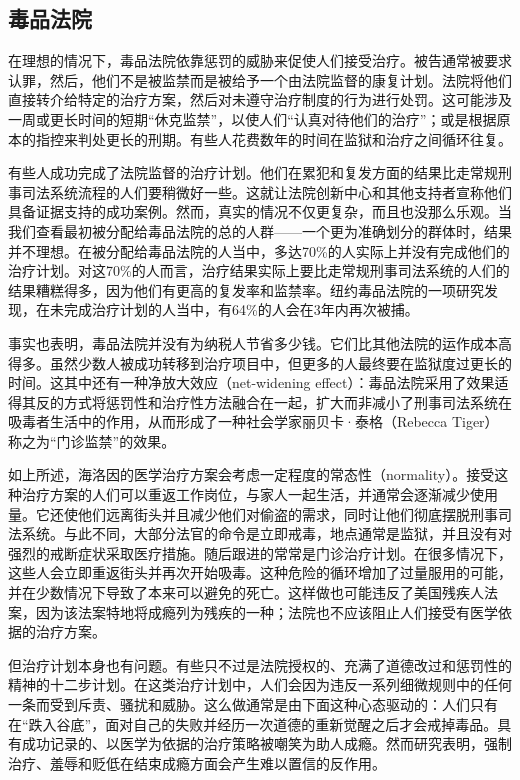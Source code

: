 \documentclass[fontset=fandol, a4paper, 12pt, openright]{ctexbook}
\begin{document}
\subsection{毒品法院}
在理想的情况下，毒品法院依靠惩罚的威胁来促使人们接受治疗。被告通常被要求认罪，然后，他们不是被监禁而是被给予一个由法院监督的康复计划。法院将他们直接转介给特定的治疗方案，然后对未遵守治疗制度的行为进行处罚。这可能涉及一周或更长时间的短期“休克监禁”，以使人们“认真对待他们的治疗”；或是根据原本的指控来判处更长的刑期。有些人花费数年的时间在监狱和治疗之间循环往复。

有些人成功完成了法院监督的治疗计划。他们在累犯和复发方面的结果比走常规刑事司法系统流程的人们要稍微好一些。这就让法院创新中心和其他支持者宣称他们具备证据支持的成功案例。然而，真实的情况不仅更复杂，而且也没那么乐观。当我们查看最初被分配给毒品法院的总的人群——一个更为准确划分的群体时，结果并不理想。在被分配给毒品法院的人当中，多达70\%的人实际上并没有完成他们的治疗计划。对这70\%的人而言，治疗结果实际上要比走常规刑事司法系统的人们的结果糟糕得多，因为他们有更高的复发率和监禁率。纽约毒品法院的一项研究发现，在未完成治疗计划的人当中，有64\%的人会在3年内再次被捕。

事实也表明，毒品法院并没有为纳税人节省多少钱。它们比其他法院的运作成本高得多。虽然少数人被成功转移到治疗项目中，但更多的人最终要在监狱度过更长的时间。这其中还有一种净放大效应（net-widening effect）：毒品法院采用了效果适得其反的方式将惩罚性和治疗性方法融合在一起，扩大而非减小了刑事司法系统在吸毒者生活中的作用，从而形成了一种社会学家丽贝卡·泰格（Rebecca Tiger）称之为“门诊监禁”的效果。

如上所述，海洛因的医学治疗方案会考虑一定程度的常态性（normality）。接受这种治疗方案的人们可以重返工作岗位，与家人一起生活，并通常会逐渐减少使用量。它还使他们远离街头并且减少他们对偷盗的需求，同时让他们彻底摆脱刑事司法系统。与此不同，大部分法官的命令是立即戒毒，地点通常是监狱，并且没有对强烈的戒断症状采取医疗措施。随后跟进的常常是门诊治疗计划。在很多情况下，这些人会立即重返街头并再次开始吸毒。这种危险的循环增加了过量服用的可能，并在少数情况下导致了本来可以避免的死亡。这样做也可能违反了美国残疾人法案，因为该法案特地将成瘾列为残疾的一种；法院也不应该阻止人们接受有医学依据的治疗方案。

但治疗计划本身也有问题。有些只不过是法院授权的、充满了道德改过和惩罚性的精神的十二步计划。在这类治疗计划中，人们会因为违反一系列细微规则中的任何一条而受到斥责、骚扰和威胁。这么做通常是由下面这种心态驱动的：人们只有在“跌入谷底”，面对自己的失败并经历一次道德的重新觉醒之后才会戒掉毒品。具有成功记录的、以医学为依据的治疗策略被嘲笑为助人成瘾。然而研究表明，强制治疗、羞辱和贬低在结束成瘾方面会产生难以置信的反作用。
\end{document}
